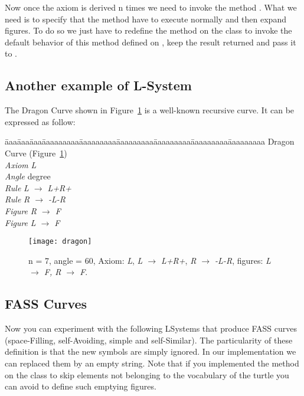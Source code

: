 Now once the axiom is derived n times we need to invoke the method
. What we need is to specify that the  method have to execute normally and then expand figures. 
To do so we just have to redefine the method 
on the class  to invoke the default behavior of
this method defined on , keep the result returned and pass
it to .



\subsection{Another example of L-System}

The Dragon Curve shown in Figure~\ref{fig:dragon} is a well-known
recursive curve. It can be expressed as follow:

\begin{tabbing}
\=aaa\=aaa\=aaa\=aaaaaaaaa\=aaaaaaaaa\=aaaaaaaaa\=aaaaaaaaa\=aaaaaaaaa\=aaaaaaaaa\kill
Dragon Curve (Figure~\ref{fig:dragon})\\
\>\>\>\> \emph{Axiom} \>\>\emph{L}\\
\>\>\>\> \emph{Angle} \> degree\\
\>\>\>\> \emph{Rule}  \>\>\emph{L $\rightarrow$ L+R+}\\
\>\>\>\> \emph{Rule}  \>\>\emph{R $\rightarrow$ -L-R}\\
\>\>\>\> \emph{Figure}  \>\>\emph{R $\rightarrow$ F}\\
\>\>\>\> \emph{Figure}  \>\>\emph{L $\rightarrow$ F}
\end{tabbing}

\begin{figure}[!htbp]
\centerline{\texttt{[image: dragon]}}
\caption{n = 7, angle = 60, Axiom: \emph{L},  \emph{L $\rightarrow$ L+R+}, \emph{R $\rightarrow$ -L-R}, figures: \emph{L $\rightarrow$ F, R $\rightarrow$ F}.}
\label{fig:dragon}
\end{figure}



\subsection{FASS Curves}
Now you can experiment with the following LSystems that produce FASS
curves (space-Filling, self-Avoiding, simple and self-Similar). The
particularity of these definition is that the new symbols are simply
ignored. In our implementation we can replaced them by an empty
string. Note that if you implemented the 
 method on the class  to skip 
elements not belonging to the vocabulary of the turtle you can avoid
to define such emptying figures.

